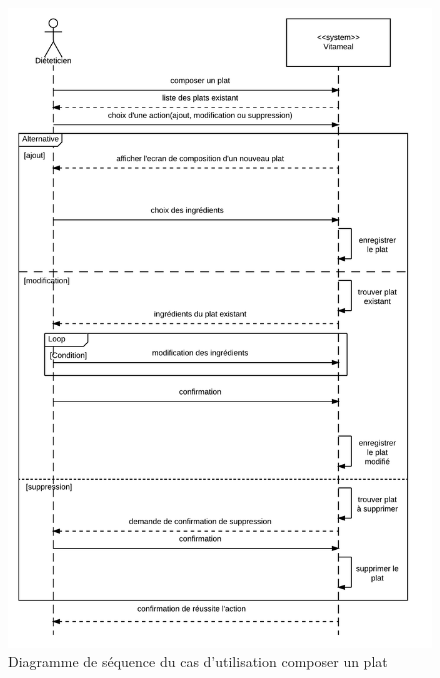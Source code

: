 \begin{figure}
\centering
\includegraphics[scale=0.3]{../../CasDUtilisations/CompositionPlat/sequence_UC_ComposerPlat.png}
\caption{Diagramme de séquence du cas d'utilisation composer un plat}
\label{ComposerPlatSeq}
\end{figure}
